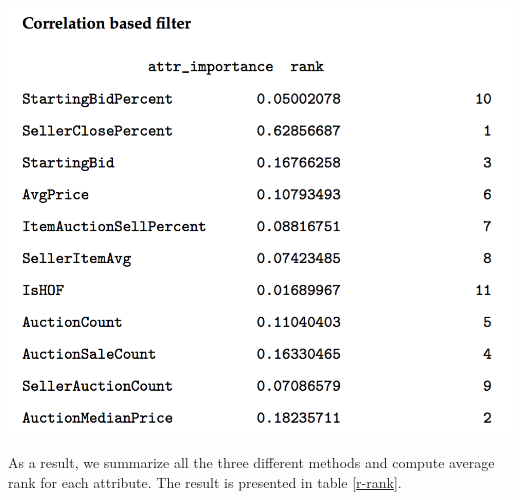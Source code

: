 \documentclass[CEJM,PDF]{cej} %
\begin{document}
\begin{center}
\includegraphics[scale=0.3]{correlation.png}\\
\end{center}

As a result, we summarize all the three different methods and compute average rank for each attribute. The result is presented in table \ref{r-rank}.
\end{document}
